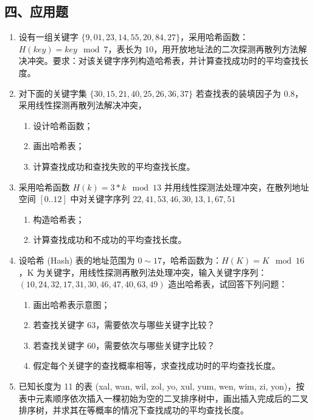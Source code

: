 \documentclass[12pt, a4paper]{article}
\begin{document}
\subsection*{四、应用题}
\begin{enumerate}
    \item 设有一组关键字 $\{9, 01, 23, 14, 55, 20, 84, 27\}$，采用哈希函数：$H(key)=key \mod 7$，表长为 10，用开放地址法的二次探测再散列方法解决冲突。要求：对该关键字序列构造哈希表，并计算查找成功时的平均查找长度。
    
    \item 对下面的关键字集 $\{30, 15, 21, 40, 25, 26, 36, 37\}$ 若查找表的装填因子为 0.8，采用线性探测再散列法解决冲突，
    \begin{enumerate}
        \item 设计哈希函数；
        \item 画出哈希表；
        \item 计算查找成功和查找失败的平均查找长度。
    \end{enumerate}
    
    \item 采用哈希函数 $H(k)=3*k \mod 13$ 并用线性探测法处理冲突，在散列地址空间 $[0..12]$ 中对关键字序列 $22, 41, 53, 46, 30, 13, 1, 67, 51$
    \begin{enumerate}
        \item 构造哈希表；
        \item 计算查找成功和不成功的平均查找长度。
    \end{enumerate}
    
    \item 设哈希 (Hash) 表的地址范围为 $0 \sim 17$，哈希函数为：$H(K)=K \mod 16$，K 为关键字，用线性探测再散列法处理冲突，输入关键字序列：$(10, 24, 32, 17, 31, 30, 46, 47, 40, 63, 49)$ 造出哈希表，试回答下列问题：
    \begin{enumerate}
        \item 画出哈希表示意图；
        \item 若查找关键字 63，需要依次与哪些关键字比较？
        \item 若查找关键字 60，需要依次与哪些关键字比较？
        \item 假定每个关键字的查找概率相等，求查找成功时的平均查找长度。
    \end{enumerate}
    
    \item 已知长度为 11 的表 (xal, wan, wil, zol, yo, xul, yum, wen, wim, zi, yon)，按表中元素顺序依次插入一棵初始为空的二叉排序树中，画出插入完成后的二叉排序树，并求其在等概率的情况下查找成功的平均查找长度。
    

\end{enumerate}
\end{document}
